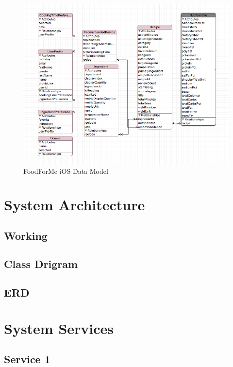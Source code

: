 	   \begin{figure}[h]
	   	\centering
	   	\includegraphics[width=1\linewidth]{figures/ch4_ios_data_model}
	   	\caption{FoodForMe iOS Data Model}
	   	\label{fig:foodforme_ios_data_model}
	   \end{figure}
	   
	  
	  
\section{System Architecture}

\subsection{Working}

\subsection{Class Drigram}

\subsection{ERD}

\section{System Services}

\subsection{Service 1}
